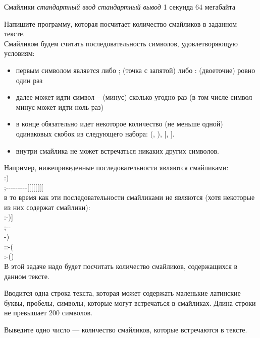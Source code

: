 \begin{problem}%
{Смайлики}%
{\textsl{стандартный ввод}}%
{\textsl{стандартный вывод}}%
{1 секунда}%
{64 мегабайта}{}

Напишите программу, которая посчитает количество смайликов в заданном тексте.\\

Смайликом будем считать последовательность символов, удовлетворяющую условиям:

\begin{itemize}
\item первым символом является либо ; (точка с запятой) либо : (двоеточие) ровно один раз
\item далее может идти символ – (минус) сколько угодно раз (в том числе символ минус может идти ноль раз)
\item в конце обязательно идет некоторое количество (не меньше одной) одинаковых скобок из следующего набора: (, ), [, ].
\item внутри смайлика не может встречаться никаких других символов.
\end{itemize}

Например, нижеприведенные последовательности являются смайликами:\\

:)\\

;{-}{-}{-}{-}{-}{-}{-}{-}{-}[[[[[[[[\\

в то время как эти последовательности смайликами не являются (хотя некоторые из них содержат смайлики):\\

:-)]\\

;{-}{-}\\

-)\\

::-(\\

:-()\\

В этой задаче надо будет посчитать количество смайликов, содержащихся в данном тексте.

\InputFile

Вводится одна строка текста, которая может содержать маленькие латинские буквы, пробелы, символы, которые могут встречаться в смайликах. Длина строки не превышает 200 символов.

\OutputFile

Выведите одно число — количество смайликов, которые встречаются в тексте.

\Examples

\begin{example}
\exmp{
:);{-}{-}{-}{-}{-}{-}[[[[[]
}{%
2
}%
\exmp{
:-)];{-}{-}{-}{-};
}{%
1
}%
%
%
\end{example}
\end{problem}